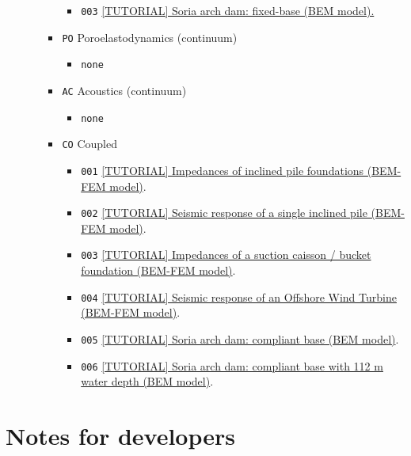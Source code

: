 \documentclass{article}
\begin{document}
\begin{itemize}
\begin{itemize}
\begin{itemize}
\begin{itemize}
                \item \texttt{003} \href{ME-TH-EL-003/}{[TUTORIAL] Soria arch dam: fixed-base (BEM model).}
            \end{itemize}            
            \item \texttt{PO} Poroelastodynamics (continuum)
            \begin{itemize}
                \item \texttt{none}
            \end{itemize}                 
            \item \texttt{AC} Acoustics (continuum)
            \begin{itemize}
                \item \texttt{none}
            \end{itemize}             
            \item \texttt{CO} Coupled 
            \begin{itemize}
                \item \texttt{001} \href{ME-TH-CO-001/}{[TUTORIAL] Impedances of inclined pile foundations (BEM-FEM model)}.
                \item \texttt{002} \href{ME-TH-CO-002/}{[TUTORIAL] Seismic response of a single inclined pile (BEM-FEM model)}.
                \item \texttt{003} \href{ME-TH-CO-003/}{[TUTORIAL] Impedances of a suction caisson / bucket foundation (BEM-FEM model)}.
                \item \texttt{004} \href{ME-TH-CO-004/}{[TUTORIAL] Seismic response of an Offshore Wind Turbine (BEM-FEM model)}.
                \item \texttt{005} \href{ME-TH-CO-005/}{[TUTORIAL] Soria arch dam: compliant base (BEM model)}.
                \item \texttt{006} \href{ME-TH-CO-006/}{[TUTORIAL] Soria arch dam: compliant base with 112 m water depth (BEM model)}.
            \end{itemize}                  
        \end{itemize}        
    \end{itemize}    
\end{itemize}

\section{Notes for developers}
\end{document}
